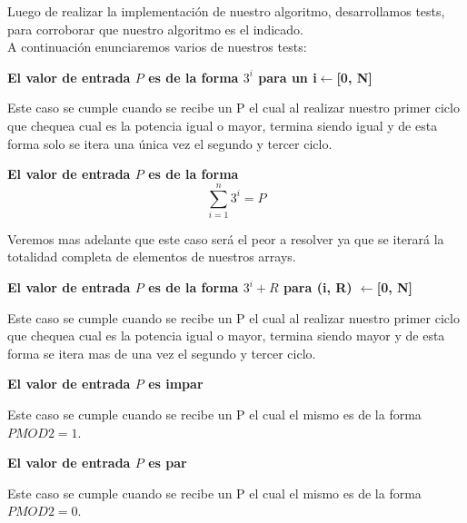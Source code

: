 \indent Luego de realizar la implementaci\'on de nuestro algoritmo, desarrollamos tests,
para corroborar que nuestro algoritmo es el indicado.\\

A continuaci\'on enunciaremos varios de nuestros tests:\\

\begin{center}
 \textbf{El valor de entrada $P$ es de la forma ${3^i}$ para un i$\gets$[0, N] }
\end{center}
 Este caso se cumple cuando se recibe un P el cual al realizar nuestro primer ciclo que chequea cual es la potencia igual o mayor, termina siendo igual y de esta forma solo se itera una \'unica vez el segundo y tercer ciclo.
 
\begin{center}
 \textbf{El valor de entrada $P$ es de la forma \[
\sum_{i=1}^{n}3^{i}=P 
\]}
\end{center}

Veremos mas adelante que este caso ser\'a el peor a resolver ya que se iterar\'a la totalidad completa de elementos de nuestros arrays.

\begin{center}
 \textbf{El valor de entrada $P$ es de la forma ${3^i} + R$ para  (i, R) $\gets$[0, N]}
\end{center}

 Este caso se cumple cuando se recibe un P el cual al realizar nuestro primer ciclo que chequea cual es la potencia igual o mayor, termina siendo mayor y de esta forma se itera mas de una vez el segundo y tercer ciclo.

\begin{center}
 \textbf{El valor de entrada $P$ es impar}
\end{center}

 Este caso se cumple cuando se recibe un P el cual el mismo es de la forma $P MOD 2 = 1$.
 
 \begin{center}
 \textbf{El valor de entrada $P$ es par}
\end{center}

 Este caso se cumple cuando se recibe un P el cual el mismo es de la forma $P MOD 2 = 0$.